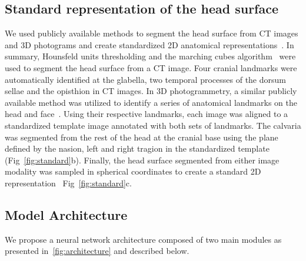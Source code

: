 \documentclass[conference]{IEEEtran}
\begin{document}
\subsection{Standard representation of the head surface}
We used publicly available methods to segment the head surface from CT images and 3D photograms and create standardized 2D anatomical representations~\cite{Porras2022Predictive}. In summary, Hounsfeld units thresholding and the marching cubes algorithm~\cite{Lorensen1987Marching} were used to segment the head surface from a CT image. Four cranial landmarks were automatically identified at the glabella, two temporal processes of the dorsum sellae and the opisthion in CT images. In 3D photogrammetry, a similar publicly available method was utilized to identify a series of anatomical landmarks on the head and face~\cite{Elkhill2023Geometric}. Using their respective landmarks, each image was aligned to a standardized template image annotated with both sets of landmarks. The calvaria was segmented from the rest of the head at the cranial base using the plane defined by the nasion, left and right tragion in the standardized template (Fig~\ref{fig:standard}b). Finally, the head surface segmented from either image modality was sampled in spherical coordinates to create a standard 2D representation~\cite{Porras2022Predictive} Fig~\ref{fig:standard}c.
\vspace{-1mm}
\subsection{Model Architecture}\label{model_architecture}
We propose a neural network architecture composed of two main modules as presented in~\ref{fig:architecture} and described below.
\end{document}
